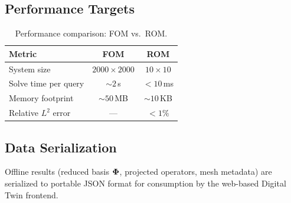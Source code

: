 \subsection{Performance Targets}

\begin{table}[H]
\centering
\caption{Performance comparison: FOM vs.\ ROM.}
\label{tab:performance}
\begin{tabular}{lcc}
\toprule
\textbf{Metric} & \textbf{FOM} & \textbf{ROM} \\
\midrule
System size & $2000 \times 2000$ & $10 \times 10$ \\
Solve time per query & $\sim 2$\,s & $< 10$\,ms \\
Memory footprint & $\sim 50$\,MB & $\sim 10$\,KB \\
Relative $L^2$ error & --- & $< 1\%$ \\
\bottomrule
\end{tabular}
\end{table}

\subsection{Data Serialization}

Offline results (reduced basis $\mathbf{\Phi}$, projected operators, mesh metadata) are serialized to portable JSON format for consumption by the web-based Digital Twin frontend.

